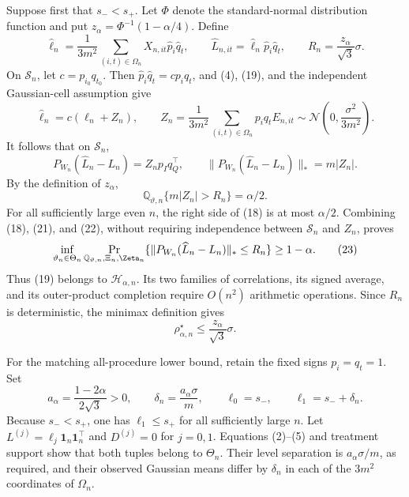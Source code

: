 Suppose first that \(s_-<s_+\).  Let \(\Phi\) denote the standard-normal distribution function and put \(z_\alpha=\Phi^{-1}(1-\alpha/4)\).  Define
\[
\widehat\ell_n=\frac1{3m^2}\sum_{(i,t)\in\Omega_n}
X_{n,it}\widehat p_i\widehat q_t,
\qquad
\widehat L_{n,it}=\widehat\ell_n\widehat p_i\widehat q_t,
\qquad
R_n=\frac{z_\alpha}{\sqrt3}\sigma.                       \tag{19}
\]
On \(\mathcal S_n\), let \(c=p_{i_0}q_{t_0}\).  Then
\(\widehat p_i\widehat q_t=cp_iq_t\), and (4), (19), and the independent Gaussian-cell assumption give
\[
\widehat\ell_n=c(\ell_n+Z_n),
\qquad
Z_n=\frac1{3m^2}\sum_{(i,t)\in\Omega_n}p_iq_tE_{n,it}
\sim\mathcal N\!\left(0,\frac{\sigma^2}{3m^2}\right).                \tag{20}
\]
It follows that on \(\mathcal S_n\),
\[
P_{W_n}(\widehat L_n-L_n)=Z_np_Iq_Q^{\top},
\qquad
\lVert P_{W_n}(\widehat L_n-L_n)\rVert_*=m|Z_n|.          \tag{21}
\]
By the definition of \(z_\alpha\),
\[
\mathbb Q_{\vartheta,n}\{m|Z_n|>R_n\}=\alpha/2.          \tag{22}
\]
For all sufficiently large even \(n\), the right side of (18) is at most \(\alpha/2\).  Combining (18), (21), and (22), without requiring independence between \(\mathcal S_n\) and \(Z_n\), proves
\[
\inf_{\vartheta_n\in\Theta_n}
\Pr_{\mathbb Q_{\vartheta,n},\Xi_n,\Zeta_n}
\{\lVert P_{W_n}(\widehat L_n-L_n)\rVert_*\le R_n\}
\ge1-\alpha.                                               \tag{23}
\]
Thus (19) belongs to \(\mathcal H_{\alpha,n}\).  Its two families of correlations, its signed average, and its outer-product completion require \(O(n^2)\) arithmetic operations.  Since \(R_n\) is deterministic, the minimax definition gives
\[
\rho_{\alpha,n}^{\star}\le \frac{z_\alpha}{\sqrt3}\sigma.           \tag{24}
\]

For the matching all-procedure lower bound, retain the fixed signs \(p_i=q_t=1\).  Set
\[
a_\alpha=\frac{1-2\alpha}{2\sqrt3}>0,
\qquad
\delta_n=\frac{a_\alpha\sigma}{m},
\qquad
\ell_0=s_-,\qquad \ell_1=s_-+\delta_n.                  \tag{25}
\]
Because \(s_-<s_+\), one has \(\ell_1\le s_+\) for all sufficiently large \(n\).  Let
\(L^{(j)}=\ell_j\mathbf1_n\mathbf1_n^{\top}\) and \(D^{(j)}=0\) for \(j=0,1\).  Equations (2)--(5) and treatment support show that both tuples belong to \(\Theta_n\).  Their level separation is \(a_\alpha\sigma/m\), as required, and their observed Gaussian means differ by \(\delta_n\) in each of the \(3m^2\) coordinates of \(\Omega_n\).

